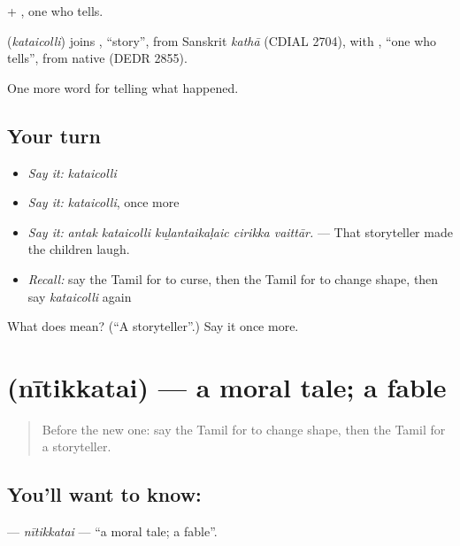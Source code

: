  + , one who tells.

\begin{cousinweb}
\textbf{} (\emph{kataicolli}) joins , \textquotedblleft{}story\textquotedblright{}, from Sanskrit \emph{kathā} (CDIAL 2704), with , \textquotedblleft{}one who tells\textquotedblright{}, from native  (DEDR 2855).
\end{cousinweb}

\begin{grammarlens}[title={What you've built}]
One more word for telling what happened.
\end{grammarlens}

\subsection*{Your turn}
\begin{itemize}
\raggedright
  \item \emph{Say it:} \emph{kataicolli}
  \item \emph{Say it:} \emph{kataicolli}, once more
  \item \emph{Say it:} \emph{antak kataicolli kuḻantaikaḷaic cirikka vaittār.} — That storyteller made the children laugh.
  \item \emph{Recall:} say the Tamil for to curse, then the Tamil for to change shape, then say \emph{kataicolli} again
\end{itemize}

\begin{tcolorbox}[breakable,colback=teal!4,colframe=teal!35!black,title={Before you move on}]
What does  mean? (\textquotedblleft{}A storyteller\textquotedblright{}.) Say it once more.
\end{tcolorbox}
\section[\texorpdfstring{\ta{நீதிக்கதை} (nītikkatai)}{நீதிக்கதை (nītikkatai)}]{ (nītikkatai) — a moral tale; a fable}

\label{lesson:TA-C345-nitikkatai}



\begin{quote}
Before the new one: say the Tamil for to change shape, then the Tamil for a storyteller.
\end{quote}

\subsection*{You'll want to know: }
\textbf{} — \emph{nītikkatai} — \textquotedblleft{}a moral tale; a fable\textquotedblright{}.

